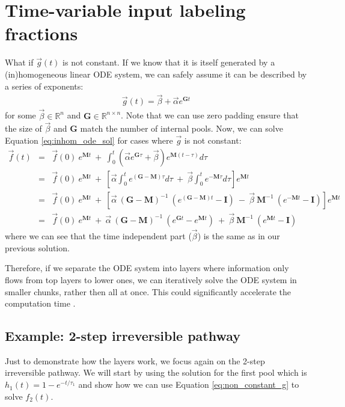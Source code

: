 \documentclass{article}
\begin{document}
\section{Time-variable input labeling fractions}\label{sec:non_constant_g}
What if $\vec{g}(t)$ is not constant. If we know that it is itself generated by a (in)homogeneous linear ODE system, we can safely assume it can be described by a series of exponents:
\begin{eqnarray}
    \vec{g}(t) = \vec{\beta} + \vec{\alpha} e^{\mathbf{G} t}
\end{eqnarray}
for some $\vec{\beta} \in \mathbb{R}^n$ and $\mathbf{G} \in \mathbb{R}^{n \times n}$. Note that we can use zero padding ensure that the size of $\vec{\beta}$ and $\mathbf{G}$ match the number of internal pools. Now, we can solve Equation \ref{eq:inhom_ode_sol} for cases where $\vec{g}$ is not constant:
\begin{eqnarray}
    \vec{f}(t) &=&
    \vec{f}(0)~e^{\mathbf{M} t} ~+~ \int_0^t \left(\vec{\alpha} e^{\mathbf{G} \tau} + \vec{\beta}\right) e^{\mathbf{M} (t-\tau)} d\tau \nonumber\\
    &=&
    \vec{f}(0)~e^{\mathbf{M} t} ~+~ \left[
    \vec{\alpha} \int_0^t e^{(\mathbf{G} - \mathbf{M})\tau} d\tau ~+~ 
    \vec{\beta} \int_0^t e^{-\mathbf{M}\tau} d\tau 
    \right] e^{\mathbf{M} t} \nonumber\\
    &=& 
    \vec{f}(0)~e^{\mathbf{M} t} ~+~ \left[
    \vec{\alpha}~(\mathbf{G}-\mathbf{M})^{-1}~(e^{(\mathbf{G} - \mathbf{M})t} - \mathbf{I}) ~-~ 
    \vec{\beta}~\mathbf{M}^{-1}~(e^{-\mathbf{M}t} - \mathbf{I})
    \right] e^{\mathbf{M} t} \nonumber\\
    &=&
    \vec{f}(0)~e^{\mathbf{M} t} ~+~
    \vec{\alpha}~(\mathbf{G}-\mathbf{M})^{-1}~(e^{\mathbf{G}t} - e^{\mathbf{M}t}) ~+~ 
    \vec{\beta}~\mathbf{M}^{-1}~(e^{\mathbf{M} t} - \mathbf{I})
    \label{eq:non_constant_g}
\end{eqnarray}
where we can see that the time independent part ($\vec{\beta}$) is the same as in our previous solution.

Therefore, if we separate the ODE system into layers where information only flows from top layers to lower ones, we can iteratively solve the ODE system in smaller chunks, rather then all at once. This could significantly accelerate the computation time \cite{young_elementary_2008}.

\subsection{Example: 2-step irreversible pathway}
Just to demonstrate how the layers work, we focus again on the 2-step irreversible pathway. We will start by using the solution for the first pool which is $h_1(t) = 1 - e^{-t/\tau_1}$ and show how we can use Equation \ref{eq:non_constant_g} to solve $f_2(t)$.
\end{document}
